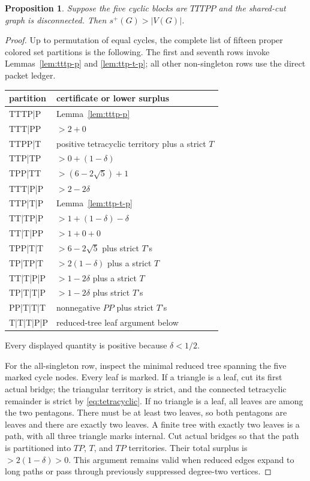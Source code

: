\documentclass[11pt]{article}
\newtheorem{proposition}[theorem]{Proposition}
\newcommand{\spE}{s^+}
\begin{document}
\begin{proposition}\label{prop:disconnected-tttpp}
Suppose the five cyclic blocks are $TTTPP$ and the shared-cut graph is
disconnected.  Then $\spE(G)>|V(G)|$.
\end{proposition}

\begin{proof}
Up to permutation of equal cycles, the complete list of fifteen proper colored
set partitions is the following.  The first and seventh rows invoke
Lemmas~\ref{lem:tttp-p} and \ref{lem:ttp-t-p}; all other non-singleton rows use
the direct packet ledger.
\begin{center}
\renewcommand{\arraystretch}{1.14}
\begin{tabular}{>{\ttfamily}l l}
partition & certificate or lower surplus\\ \hline
TTTP|P & Lemma~\ref{lem:tttp-p}\\
TTT|PP & $>2+0$\\
TTPP|T & positive tetracyclic territory plus a strict $T$\\
TTP|TP & $>0+(1-\delta)$\\
TPP|TT & $>(6-2\sqrt5)+1$\\
TTT|P|P & $>2-2\delta$\\
TTP|T|P & Lemma~\ref{lem:ttp-t-p}\\
TT|TP|P & $>1+(1-\delta)-\delta$\\
TT|T|PP & $>1+0+0$\\
TPP|T|T & $>6-2\sqrt5$ plus strict $T$'s\\
TP|TP|T & $>2(1-\delta)$ plus a strict $T$\\
TT|T|P|P & $>1-2\delta$ plus a strict $T$\\
TP|T|T|P & $>1-2\delta$ plus strict $T$'s\\
PP|T|T|T & nonnegative $PP$ plus strict $T$'s\\
T|T|T|P|P & reduced-tree leaf argument below
\end{tabular}
\end{center}
Every displayed quantity is positive because $\delta<1/2$.

For the all-singleton row, inspect the minimal reduced tree spanning the five
marked cycle nodes.  Every leaf is marked.  If a triangle is a leaf, cut its
first actual bridge; the triangular territory is strict, and the connected
tetracyclic remainder is strict by \eqref{eq:tetracyclic}.  If no triangle is
a leaf, all leaves are among the two pentagons.  There must be at least two
leaves, so both pentagons are leaves and there are exactly two leaves.  A finite
tree with exactly two leaves is a path, with all three triangle marks internal.
Cut actual bridges so that the path is partitioned into $TP$, $T$, and $TP$
territories.  Their total surplus is
$>2(1-\delta)>0$.  This argument remains valid when reduced edges expand to
long paths or pass through previously suppressed degree-two vertices.
\end{proof}
\end{document}
